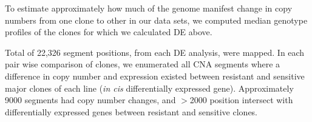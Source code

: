 




To estimate approximately how much of the genome manifest change in copy numbers from one clone to other in our data sets, we computed median genotype profiles of the clones for which we calculated \ac{DE} above.

Total of 22,326 segment positions, from each DE analysis, were mapped. In each pair wise comparison of clones, we enumerated all CNA segments where a difference in copy number and expression existed between resistant and sensitive major clones of each line (\textit{in cis} differentially expressed gene). Approximately 9000 segments had copy number changes, and $>$2000 position intersect with differentially expressed genes between resistant and sensitive clones.

